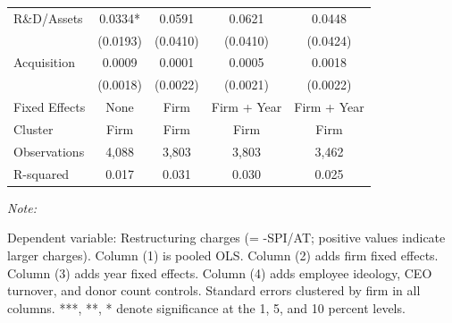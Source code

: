 \documentclass[
  10pt,
]{article}
\begin{document}
\begin{table}[!h]
\begin{threeparttable}
\begin{tabular}[t]{lcccc}
R\&D/Assets & 0.0334* & 0.0591 & 0.0621 & 0.0448\\
 & (0.0193) & (0.0410) & (0.0410) & (0.0424)\\
Acquisition & 0.0009 & 0.0001 & 0.0005 & 0.0018\\
 & (0.0018) & (0.0022) & (0.0021) & (0.0022)\\
\midrule
\addlinespace
Fixed Effects & None & Firm & Firm + Year & Firm + Year\\
Cluster & Firm & Firm & Firm & Firm\\
Observations & 4,088 & 3,803 & 3,803 & 3,462\\
R-squared & 0.017 & 0.031 & 0.030 & 0.025\\
\bottomrule
\end{tabular}
\begin{tablenotes}[para]
\item \textit{Note: } 
\item Dependent variable: Restructuring charges (= -SPI/AT; positive values indicate larger charges). Column (1) is pooled OLS. Column (2) adds firm fixed effects. Column (3) adds year fixed effects. Column (4) adds employee ideology, CEO turnover, and donor count controls. Standard errors clustered by firm in all columns. ***, **, * denote significance at the 1, 5, and 10 percent levels.
\end{tablenotes}
\end{threeparttable}
\end{table}

\newpage
\end{document}
